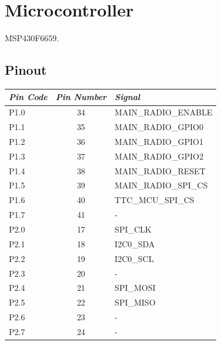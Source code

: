 \section{Microcontroller}

MSP430F6659.

\subsection{Pinout}

\begin{table}[!h]
    \centering
    \begin{tabular}{lcl}
        \toprule[1.5pt]
        \textit{Pin Code} & \textit{Pin Number} & \textit{Signal}       \\
        \midrule
        P1.0              & 34                  & MAIN\_RADIO\_ENABLE   \\
        P1.1              & 35                  & MAIN\_RADIO\_GPIO0    \\
        P1.2              & 36                  & MAIN\_RADIO\_GPIO1    \\
        P1.3              & 37                  & MAIN\_RADIO\_GPIO2    \\
        P1.4              & 38                  & MAIN\_RADIO\_RESET    \\
        P1.5              & 39                  & MAIN\_RADIO\_SPI\_CS  \\
        P1.6              & 40                  & TTC\_MCU\_SPI\_CS     \\
        P1.7              & 41                  & -                     \\
        \midrule
        P2.0              & 17                  & SPI\_CLK              \\
        P2.1              & 18                  & I2C0\_SDA             \\
        P2.2              & 19                  & I2C0\_SCL             \\
        P2.3              & 20                  & -                     \\
        P2.4              & 21                  & SPI\_MOSI             \\
        P2.5              & 22                  & SPI\_MISO             \\
        P2.6              & 23                  & -                     \\
        P2.7              & 24                  & -                     \\

\end{tabular}
\end{table}
